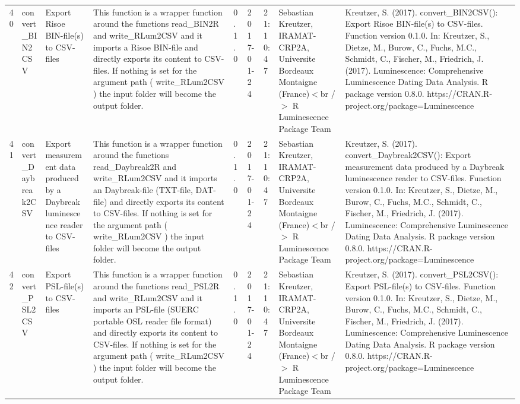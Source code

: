\begin{table}[ht]
\begin{tabular}{rllllllll}
 \\ 
  40 & convert\_BIN2CSV & Export Risoe BIN-file(s) to CSV-files & This function is a wrapper function around the functions  read\_BIN2R  and write\_RLum2CSV  and it imports a Risoe BIN-file and directly exports its content to CSV-files. If nothing is set for the argument  path  ( write\_RLum2CSV ) the input folder will become the output folder. & 0.1.0 & 2017-01-24 & 21:10:47
 & Sebastian Kreutzer, IRAMAT-CRP2A, Universite Bordeaux Montaigne (France)$<$br /$>$  R Luminescence Package Team & Kreutzer, S. (2017). convert\_BIN2CSV(): Export Risoe BIN-file(s) to CSV-files. Function version 0.1.0. In: Kreutzer, S., Dietze, M., Burow, C., Fuchs, M.C., Schmidt, C., Fischer, M., Friedrich, J. (2017). Luminescence: Comprehensive Luminescence Dating Data Analysis. R package version 0.8.0. https://CRAN.R-project.org/package=Luminescence
 \\ 
  41 & convert\_Daybreak2CSV & Export measurement data produced by a Daybreak luminescence reader to CSV-files & This function is a wrapper function around the functions  read\_Daybreak2R  and write\_RLum2CSV  and it imports an Daybreak-file (TXT-file, DAT-file) and directly exports its content to CSV-files.  If nothing is set for the argument  path  ( write\_RLum2CSV ) the input folder will become the output folder. & 0.1.0 & 2017-01-24 & 21:10:47
 & Sebastian Kreutzer, IRAMAT-CRP2A, Universite Bordeaux Montaigne (France)$<$br /$>$  R Luminescence Package Team & Kreutzer, S. (2017). convert\_Daybreak2CSV(): Export measurement data produced by a Daybreak luminescence reader to CSV-files. Function version 0.1.0. In: Kreutzer, S., Dietze, M., Burow, C., Fuchs, M.C., Schmidt, C., Fischer, M., Friedrich, J. (2017). Luminescence: Comprehensive Luminescence Dating Data Analysis. R package version 0.8.0. https://CRAN.R-project.org/package=Luminescence
 \\ 
  42 & convert\_PSL2CSV & Export PSL-file(s) to CSV-files & This function is a wrapper function around the functions  read\_PSL2R  and write\_RLum2CSV  and it imports an PSL-file (SUERC portable OSL reader file format) and directly exports its content to CSV-files. If nothing is set for the argument  path  ( write\_RLum2CSV ) the input folder will become the output folder. & 0.1.0 & 2017-01-24 & 21:10:47
 & Sebastian Kreutzer, IRAMAT-CRP2A, Universite Bordeaux Montaigne (France)$<$br /$>$  R Luminescence Package Team & Kreutzer, S. (2017). convert\_PSL2CSV(): Export PSL-file(s) to CSV-files. Function version 0.1.0. In: Kreutzer, S., Dietze, M., Burow, C., Fuchs, M.C., Schmidt, C., Fischer, M., Friedrich, J. (2017). Luminescence: Comprehensive Luminescence Dating Data Analysis. R package version 0.8.0. https://CRAN.R-project.org/package=Luminescence

\end{tabular}
\end{table}
